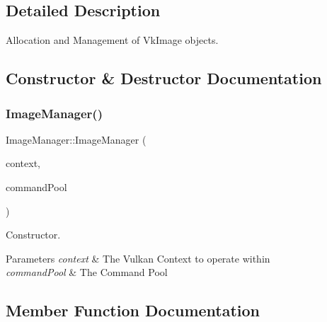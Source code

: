 \subsection{Detailed Description}
Allocation and Management of Vk\+Image objects. 

\subsection{Constructor \& Destructor Documentation}
\mbox{\label{class_image_manager_adc24d10b860e7d33641636267e0e5e85}} 
\subsubsection{\texorpdfstring{ImageManager()}{ImageManager()}}
{\footnotesize\ttfamily Image\+Manager\+::\+Image\+Manager (\begin{DoxyParamCaption}\item[{std\+::shared\+\_\+ptr$<$ \mbox{\hyperlink{class_vulkan_context}{Vulkan\+Context}} $>$}]{context,  }\item[{std\+::shared\+\_\+ptr$<$ \mbox{\hyperlink{class_command_pool}{Command\+Pool}} $>$}]{command\+Pool }\end{DoxyParamCaption})}



Constructor. 


\begin{DoxyParams}{Parameters}
{\em context} & The Vulkan Context to operate within \\
\hline
{\em command\+Pool} & The Command Pool \\
\hline
\end{DoxyParams}


\subsection{Member Function Documentation}
\mbox{\label{class_image_manager_aba1591b66357882bb624595bb61fa059}} 

